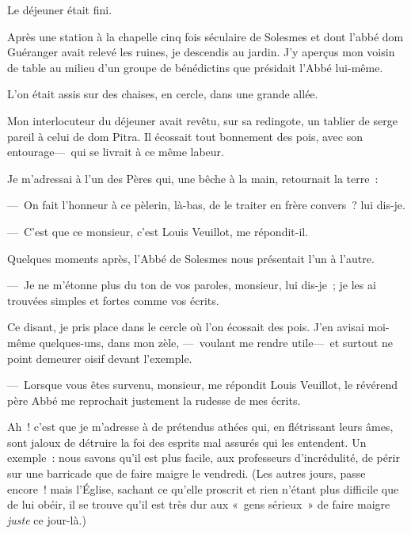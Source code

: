\documentclass[french,twoside]{book} %
\begin{document}
   Le déjeuner était fini.\par
Après une station à la chapelle cinq fois séculaire de Solesmes et dont l’abbé dom Guéranger avait relevé les ruines, je descendis au jardin. J’y aperçus mon voisin de table au milieu d’un groupe de bénédictins que présidait l’Abbé lui-même.\par
L’on était assis sur des chaises, en cercle, dans une grande allée.\par
Mon interlocuteur du déjeuner avait revêtu, sur sa redingote, un tablier de serge pareil à celui de dom Pitra. Il écossait tout bonnement des pois, avec son entourage— qui se livrait à ce même labeur.\par
Je m’adressai à l’un des Pères qui, une bêche à la main, retournait la terre :\par
— On fait l’honneur à ce pèlerin, là-bas, de le traiter en frère convers ? lui dis-je.\par
— C’est que ce monsieur, c’est Louis Veuillot, me répondit-il.\par
Quelques moments après, l’Abbé de Solesmes nous présentait l’un à l’autre.\par
— Je ne m’étonne plus du ton de vos paroles,   monsieur, lui dis-je ; je les ai trouvées simples et fortes comme vos écrits.\par
Ce disant, je pris place dans le cercle où l’on écossait des pois. J’en avisai moi-même quelques-uns, dans mon zèle, — voulant me rendre utile— et surtout ne point demeurer oisif devant l’exemple.\par
— Lorsque vous êtes survenu, monsieur, me répondit Louis Veuillot, le révérend père Abbé me reprochait justement la rudesse de mes écrits.\par
Ah ! c’est que je m’adresse à de prétendus athées qui, en flétrissant leurs âmes, sont jaloux de détruire la foi des esprits mal assurés qui les entendent. Un exemple : nous savons qu’il est plus facile, aux professeurs d’incrédulité, de périr sur une barricade que de faire maigre le vendredi. (Les autres jours, passe encore ! mais l’Église, sachant ce qu’elle proscrit et rien n’étant plus difficile que de lui obéir, il se trouve qu’il est très dur aux « gens sérieux » de faire maigre \emph{juste} ce jour-là.)\par
\end{document}
